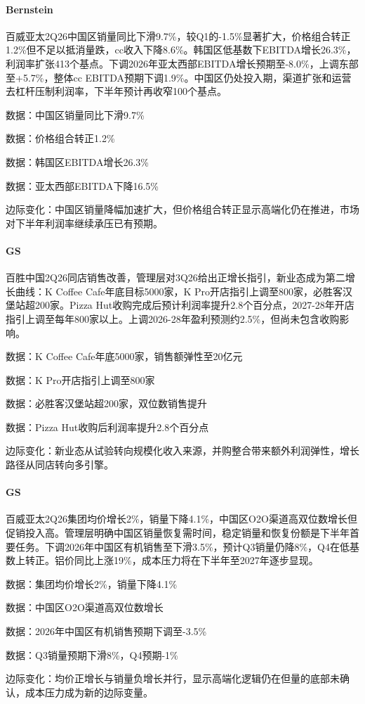 \documentclass[11pt]{ctexart}
\begin{document}
\paragraph{Bernstein} 百威亚太2Q26中国区销量同比下滑9.7\%，较Q1的-1.5\%显著扩大，价格组合转正1.2\%但不足以抵消量跌，cc收入下降8.6\%。韩国区低基数下EBITDA增长26.3\%，利润率扩张413个基点。下调2026年亚太西部EBITDA增长预期至-8.0\%，上调东部至+5.7\%，整体cc EBITDA预期下调1.9\%。中国区仍处投入期，渠道扩张和运营去杠杆压制利润率，下半年预计再收窄100个基点。
{\small\color{refgray}数据：中国区销量同比下滑9.7\%\par}
{\small\color{refgray}数据：价格组合转正1.2\%\par}
{\small\color{refgray}数据：韩国区EBITDA增长26.3\%\par}
{\small\color{refgray}数据：亚太西部EBITDA下降16.5\%\par}
{\small\color{refgray}边际变化：中国区销量降幅加速扩大，但价格组合转正显示高端化仍在推进，市场对下半年利润率继续承压已有预期。\par}
\paragraph{GS} 百胜中国2Q26同店销售改善，管理层对3Q26给出正增长指引，新业态成为第二增长曲线：K Coffee Cafe年底目标5000家，K Pro开店指引上调至800家，必胜客汉堡站超200家。Pizza Hut收购完成后预计利润率提升2.8个百分点，2027-28年开店指引上调至每年800家以上。上调2026-28年盈利预测约2.5\%，但尚未包含收购影响。
{\small\color{refgray}数据：K Coffee Cafe年底5000家，销售额弹性至20亿元\par}
{\small\color{refgray}数据：K Pro开店指引上调至800家\par}
{\small\color{refgray}数据：必胜客汉堡站超200家，双位数销售提升\par}
{\small\color{refgray}数据：Pizza Hut收购后利润率提升2.8个百分点\par}
{\small\color{refgray}边际变化：新业态从试验转向规模化收入来源，并购整合带来额外利润弹性，增长路径从同店转向多引擎。\par}
\paragraph{GS} 百威亚太2Q26集团均价增长2\%，销量下降4.1\%，中国区O2O渠道高双位数增长但促销投入高。管理层明确中国区销量恢复需时间，稳定销量和恢复份额是下半年首要任务。下调2026年中国区有机销售至下滑3.5\%，预计Q3销量仍降8\%，Q4在低基数上转正。铝价同比上涨19\%，成本压力将在下半年至2027年逐步显现。
{\small\color{refgray}数据：集团均价增长2\%，销量下降4.1\%\par}
{\small\color{refgray}数据：中国区O2O渠道高双位数增长\par}
{\small\color{refgray}数据：2026年中国区有机销售预期下调至-3.5\%\par}
{\small\color{refgray}数据：Q3销量预期下滑8\%，Q4预期-1\%\par}
{\small\color{refgray}边际变化：均价正增长与销量负增长并行，显示高端化逻辑仍在但量的底部未确认，成本压力成为新的边际变量。\par}
\end{document}
